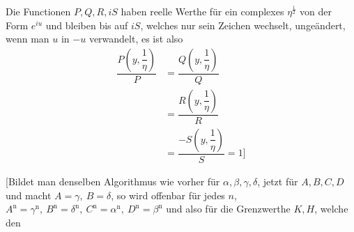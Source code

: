 Die Functionen $P,\allowbreak Q,\allowbreak R,\allowbreak iS$ haben reelle Werthe für ein complexes $\eta^{\frac12}$ von der Form $e^{iu}$ und bleiben bis auf $iS$, welches nur sein Zeichen wechselt, ungeändert, wenn man $u$ in $-u$ verwandelt, es ist also
\[
\begin{aligned}\dfrac{P(y,\dfrac1\eta)}P
&=\dfrac{Q(y,\dfrac1\eta)}Q
\\[7pt]&=\dfrac{R(y,\dfrac1\eta)}R
\\[7pt]&=\dfrac{-S(y,\dfrac1\eta)}S=1
\text{]}\end{aligned}
\]

[Bildet man denselben Algorithmus wie vorher für $\alpha,\allowbreak \beta,\allowbreak \gamma,\allowbreak \delta$, jetzt für $A,\allowbreak B,\allowbreak C,\allowbreak D$ und macht $A=\gamma,\allowbreak \ B=\delta$, so wird offenbar für jedes $n$, $A^{\mathrm n}=\gamma^{\mathrm n},\allowbreak \ B^{\mathrm n}=\delta^{\mathrm n},\allowbreak \ C^{\mathrm n}=\alpha^{\mathrm n},\allowbreak \ D^{\mathrm n}=\beta^{\mathrm n}$ und also für die Grenzwerthe $K,\allowbreak H$, welche den
